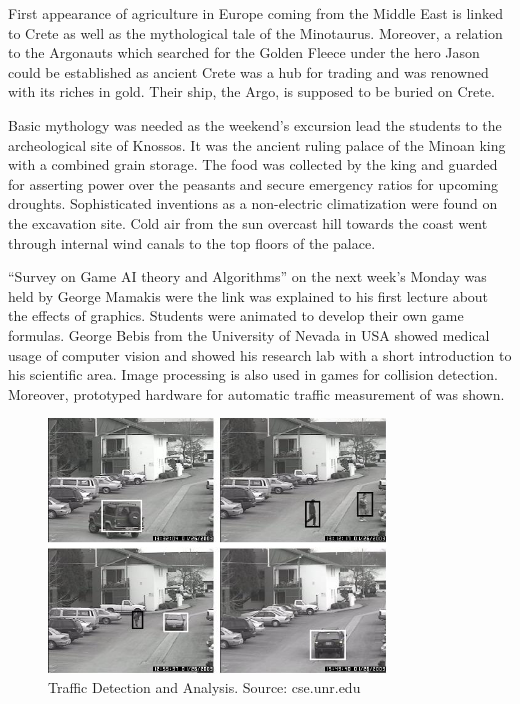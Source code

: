 \documentclass[bibtotocnumbered, headsepline,normalheadings,12pt]{report}
\begin{document}
First appearance of agriculture in Europe coming from the Middle East is linked to Crete as well as the mythological tale of the Minotaurus. Moreover, 
a relation to the Argonauts which searched for the Golden Fleece under the hero Jason could be established as ancient Crete was a hub for trading and 
was renowned with its riches in gold. Their ship, the Argo, is supposed to be buried on Crete.

Basic mythology was needed as the weekend's excursion lead the students to the archeological site of Knossos. It was the ancient ruling palace of the Minoan
king with a combined grain storage. The food was collected by the king and guarded for asserting power over the peasants and secure emergency ratios for 
upcoming droughts. Sophisticated inventions as a non-electric climatization were found on the excavation site. Cold air from the sun overcast hill towards
the coast went through internal wind canals to the top floors of the palace.

``Survey on Game AI theory and Algorithms'' on the next week's Monday was held by George Mamakis were the link was explained to his first lecture about
the effects of graphics. Students were animated to develop their own game formulas. George Bebis from the University of Nevada in USA showed medical 
usage of computer vision and showed his research lab with a short introduction to his scientific area. Image processing is also used in games for collision 
detection. Moreover, prototyped hardware for automatic traffic measurement of was shown.

\begin{figure}[H]
    \centering
    \includegraphics[width=0.8\textwidth]{bebis.jpg}%
    \caption{Traffic Detection and Analysis. Source: cse.unr.edu}
    \label{fig:bebis}%
\end{figure}
\end{document}
